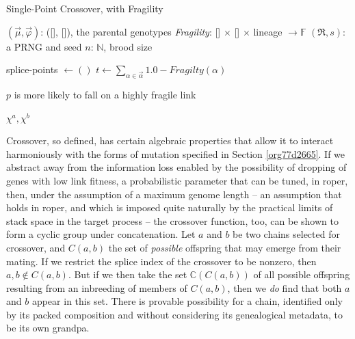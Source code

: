 \documentclass[12pt,glossary]{dalthesis}
\begin{document}
\begin{algorithm}
\caption{Single-Point Crossover, with Fragility} \label{alg:crossover}
\begin{algorithmic}[1]

\REQUIRE $(\vec{\mu}, \vec{\varphi})$: ([\!], [\!]), the parental genotypes 
\REQUIRE \emph{Fragility}: [\!] $\times$ [\!] $\times$ lineage $\to \mathbb{F}$ 
\REQUIRE $(\mathfrak{R}, s)$: a PRNG and seed \REQUIRE $n$: $\mathbb{N}$, brood size


\STATE
{splice-points $\gets ()$}  \FOR {$\vec{\alpha} \in (\vec{\mu }, \vec{\varphi})$} 
\STATE
{$t \gets \sum_{\alpha \in \vec{\alpha}} 1.0 - \textit{Fragilty}(\alpha)$}

 \COMMENT
{$p$ is more likely to fall on a highly fragile link} 

  
 \ENDWHILE 
{} \ENDFOR 
{} 

 \RETURN
{$\chi^a, \chi^b$} 
\end{algorithmic} 
\end{algorithm}

Crossover, so defined, has certain algebraic properties that allow it
to interact harmoniously with the forms of mutation specified in 
Section \ref{org77d2665}. If we abstract away from the information loss
enabled by the possibility of dropping of genes with low link fitness, a
probabilistic parameter that can be tuned, in \gls{roper}, then, under the
assumption of a maximum genome length -- an assumption that holds in \gls{roper},
and which is imposed quite naturally by the practical limits of stack space in
the target process -- the crossover function, too, can be shown to form a cyclic group
under concatenation. Let \(a\) and \(b\) be two chains selected for crossover, and 
\(C(a,b)\) the set of \emph{possible} offspring that may emerge from their mating. If
we restrict the splice index of the crossover to be nonzero, then \(a,b \not \in C(a,b)\).
But if we then take the set \(\mathbb{C}(C(a,b))\) of all possible offspring resulting
from an inbreeding of members of \(C(a,b)\), then we \emph{do} find that both \(a\) and \(b\)
appear in this set. There is provable possibility for a chain, identified only by
its packed composition and without considering its genealogical metadata, to be its
own grandpa. 
\end{document}
